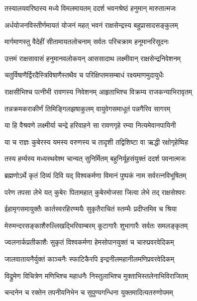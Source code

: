 
\twolineshloka
{तस्यालयवरिष्ठस्य मध्ये विमलमायतम्}
{ददर्श भवनश्रेष्ठं हनुमान् मारुतात्मजः} %

\twolineshloka
{अर्धयोजनविस्तीर्णमायतं योजनं महत्}
{भवनं राक्षसेन्द्रस्य बहुप्रासादसङ्कुलम्} %

\twolineshloka
{मार्गमाणस्तु वैदेहीं सीतामायतलोचनाम्}
{सर्वतः परिचक्राम हनूमानरिसूदनः} %

\twolineshloka
{उत्तमं राक्षसावासं हनुमानवलोकयन्}
{आससादाथ लक्ष्मीवान् राक्षसेन्द्रनिवेशनम्} %

\twolineshloka
{चतुर्विषाणैर्द्विरदैस्त्रिविषाणैस्तथैव च}
{परिक्षिप्तमसम्बाधं रक्ष्यमाणमुदायुधैः} %

\twolineshloka
{राक्षसीभिश्च पत्नीभी रावणस्य निवेशनम्}
{आहृताभिश्च विक्रम्य राजकन्याभिरावृतम्} %

\twolineshloka
{तन्नक्रमकराकीर्णं तिमिङ्गिलझषाकुलम्}
{वायुवेगसमाधूतं पन्नगैरिव सागरम्} %

\twolineshloka
{या हि वैश्रवणे लक्ष्मीर्या चन्द्रे हरिवाहने}
{सा रावणगृहे रम्या नित्यमेवानपायिनी} %

\twolineshloka
{या च राज्ञः कुबेरस्य यमस्य वरुणस्य च}
{तादृशी तद्विशिष्टा वा ऋद्धी रक्षोगृहेष्विह} %

\twolineshloka
{तस्य हर्म्यस्य मध्यस्थवेश्म चान्यत् सुनिर्मितम्}
{बहुनिर्यूहसंयुक्तं ददर्श पवनात्मजः} %

\twolineshloka
{ब्रह्मणोऽर्थे कृतं दिव्यं दिवि यद् विश्वकर्मणा}
{विमानं पुष्पकं नाम सर्वरत्नविभूषितम्} %

\twolineshloka
{परेण तपसा लेभे यत् कुबेरः पितामहात्}
{कुबेरमोजसा जित्वा लेभे तद् राक्षसेश्वरः} %

\twolineshloka
{ईहामृगसमायुक्तैः कार्तस्वरहिरण्मयैः}
{सुकृतैराचितं स्तम्भैः प्रदीप्तमिव च श्रिया} %

\twolineshloka
{मेरुमन्दरसङ्काशैरुल्लिखद्भिरिवाम्बरम्}
{कूटागारैः शुभागारैः सर्वतः समलङ्कृतम्} %

\twolineshloka
{ज्वलनार्कप्रतीकाशैः सुकृतं विश्वकर्मणा}
{हेमसोपानयुक्तं च चारुप्रवरवेदिकम्} %

\twolineshloka
{जालवातायनैर्युक्तं काञ्चनैः स्फाटिकैरपि}
{इन्द्रनीलमहानीलमणिप्रवरवेदिकम्} %

\twolineshloka
{विद्रुमेण विचित्रेण मणिभिश्च महाधनैः}
{निस्तुलाभिश्च मुक्ताभिस्तलेनाभिविराजितम्} %

\twolineshloka
{चन्दनेन च रक्तेन तपनीयनिभेन च}
{सुपुण्यगन्धिना युक्तमादित्यतरुणोपमम्} %

